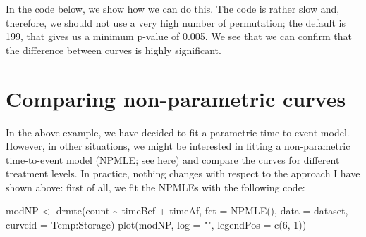 \documentclass[
]{book}
\newenvironment{Shaded}{\begin{snugshade}}{\end{snugshade}}
\newcommand{\AttributeTok}[1]{\textcolor[rgb]{0.77,0.63,0.00}{#1}}
\newcommand{\DecValTok}[1]{\textcolor[rgb]{0.00,0.00,0.81}{#1}}
\newcommand{\DocumentationTok}[1]{\textcolor[rgb]{0.56,0.35,0.01}{\textbf{\textit{#1}}}}
\newcommand{\FunctionTok}[1]{\textcolor[rgb]{0.00,0.00,0.00}{#1}}
\newcommand{\NormalTok}[1]{#1}
\newcommand{\OtherTok}[1]{\textcolor[rgb]{0.56,0.35,0.01}{#1}}
\newcommand{\SpecialCharTok}[1]{\textcolor[rgb]{0.00,0.00,0.00}{#1}}
\newcommand{\StringTok}[1]{\textcolor[rgb]{0.31,0.60,0.02}{#1}}
\begin{document}
In the code below, we show how we can do this. The code is rather slow and, therefore, we should not use a very high number of permutation; the default is 199, that gives us a minimum p-value of 0.005. We see that we can confirm that the difference between curves is highly significant.

\begin{Shaded}
\end{Shaded}

\hypertarget{comparing-non-parametric-curves}{%
\section{Comparing non-parametric curves}\label{comparing-non-parametric-curves}}

In the above example, we have decided to fit a parametric time-to-event model. However, in other situations, we might be interested in fitting a non-parametric time-to-event model (NPMLE; \href{https://www.statforbiology.com/2021/stat_drcte_4-time-to-eventcurves/}{see here}) and compare the curves for different treatment levels. In practice, nothing changes with respect to the approach I have shown above: first of all, we fit the NPMLEs with the following code:

\begin{Shaded}
\begin{Highlighting}[]
\NormalTok{modNP }\OtherTok{\textless{}{-}} \FunctionTok{drmte}\NormalTok{(count }\SpecialCharTok{\textasciitilde{}}\NormalTok{ timeBef }\SpecialCharTok{+}\NormalTok{ timeAf, }\AttributeTok{fct =} \FunctionTok{NPMLE}\NormalTok{(),}
            \AttributeTok{data =}\NormalTok{ dataset, }
            \AttributeTok{curveid =}\NormalTok{ Temp}\SpecialCharTok{:}\NormalTok{Storage)}
\FunctionTok{plot}\NormalTok{(modNP, }\AttributeTok{log =} \StringTok{""}\NormalTok{, }\AttributeTok{legendPos =} \FunctionTok{c}\NormalTok{(}\DecValTok{6}\NormalTok{, }\DecValTok{1}\NormalTok{))}
\end{Highlighting}
\end{Shaded}
\end{document}
